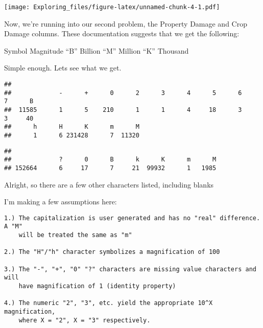 \documentclass[
]{article}
\newenvironment{Shaded}{\begin{snugshade}}{\end{snugshade}}
\newcommand{\FunctionTok}[1]{\textcolor[rgb]{0.00,0.00,0.00}{#1}}
\newcommand{\NormalTok}[1]{#1}
\newcommand{\OtherTok}[1]{\textcolor[rgb]{0.56,0.35,0.01}{#1}}
\newcommand{\SpecialCharTok}[1]{\textcolor[rgb]{0.00,0.00,0.00}{#1}}
\begin{document}
\texttt{[image: Exploring\_files/figure-latex/unnamed-chunk-4-1.pdf]}

\begin{Shaded}
\end{Shaded}

Now, we're running into our second problem, the Property Damage and Crop
Damage columns. These documentation suggests that we get the following:

Symbol Magnitude ``B'' Billion ``M'' Million ``K'' Thousand

Simple enough. Lets see what we get.

\begin{Shaded}
\end{Shaded}

\begin{verbatim}
## 
##             -      +      0      2      3      4      5      6      7      B 
##  11585      1      5    210      1      1      4     18      3      3     40 
##      h      H      K      m      M 
##      1      6 231428      7  11320
\end{verbatim}

\begin{Shaded}
\end{Shaded}

\begin{verbatim}
## 
##             ?      0      B      k      K      m      M 
## 152664      6     17      7     21  99932      1   1985
\end{verbatim}

Alright, so there are a few other characters listed, including blanks

I'm making a few assumptions here:

\begin{verbatim}
1.) The capitalization is user generated and has no "real" difference. A "M" 
    will be treated the same as "m"

2.) The "H"/"h" character symbolizes a magnification of 100 

3.) The "-", "+", "0" "?" characters are missing value characters and will 
    have magnification of 1 (identity property)

4.) The numeric "2", "3", etc. yield the appropriate 10^X magnification, 
    where X = "2", X = "3" respectively. 
\end{verbatim}
\end{document}
